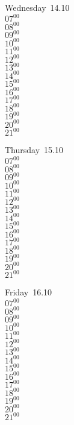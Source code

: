 \documentclass[11pt,a4paper]{book}\usepackage[]{graphicx}\usepackage[]{color}
\begin{document}
\begin{weekdaybox}
  Wednesday~14.10\\
  { 
  \vfill
  $07^{00}$\\
$08^{00}$\\
$09^{00}$\\
$10^{00}$\\
$11^{00}$\\
$12^{00}$\\
$13^{00}$\\
$14^{00}$\\
$15^{00}$\\
$16^{00}$\\
$17^{00}$\\
$18^{00}$\\
$19^{00}$\\
$20^{00}$\\
$21^{00}$\\
  }
\end{weekdaybox}
\clearpage
\begin{headerbox}
\end{headerbox}
\begin{weekdaybox}
  Thursday~15.10\\
  { 
  \vfill
  $07^{00}$\\
$08^{00}$\\
$09^{00}$\\
$10^{00}$\\
$11^{00}$\\
$12^{00}$\\
$13^{00}$\\
$14^{00}$\\
$15^{00}$\\
$16^{00}$\\
$17^{00}$\\
$18^{00}$\\
$19^{00}$\\
$20^{00}$\\
$21^{00}$\\
  }
\end{weekdaybox} 
\begin{weekdaybox}
  Friday~16.10\\
  { 
  \vfill
  $07^{00}$\\
$08^{00}$\\
$09^{00}$\\
$10^{00}$\\
$11^{00}$\\
$12^{00}$\\
$13^{00}$\\
$14^{00}$\\
$15^{00}$\\
$16^{00}$\\
$17^{00}$\\
$18^{00}$\\
$19^{00}$\\
$20^{00}$\\
$21^{00}$\\
  }
\end{weekdaybox}
\end{document}
